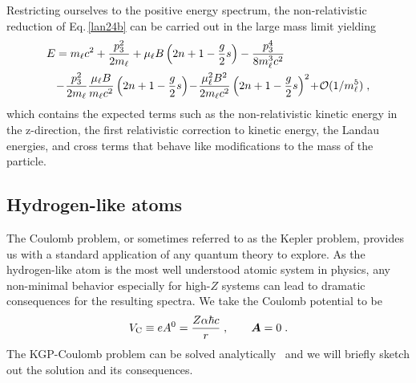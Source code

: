 Restricting ourselves to the positive energy spectrum, the non-relativistic reduction of Eq.\,\eqref{lan24b} can be carried out in the large mass limit yielding
\begin{alignat}{1}
\label{lan27} E&=m_{\ell}c^{2}+\frac{p_{3}^{2}}{2m_{\ell}}+\mu_{\ell}B\left(2n+1-\frac{g}{2}s\right)-\frac{p_{3}^{4}}{8m_{\ell}^{3}c^{2}}\\ \notag &\!-\!\frac{p_{3}^{2}}{2m_{\ell}}\frac{\mu_{\ell}B}{m_{\ell}c^{2}}\left(2n+1-\frac{g}{2}s\right)\!-\!\frac{\mu_{\ell}^{2}B^{2}}{2m_{\ell}c^{2}}\left(2n+1-\frac{g}{2}s\right)^{2}\!+\!\mathcal{O}(1/m_{\ell}^{5})\;,\end{alignat}
which contains the expected terms such as the non-relativistic kinetic energy in the z-direction, the first relativistic correction to kinetic energy, the Landau energies, and cross terms that behave like modifications to the mass of the particle.








\subsection{Hydrogen-like atoms}
\label{sec:coulomb}
The Coulomb problem, or sometimes referred to as the Kepler problem, provides us with a standard application of any quantum theory to explore. As the hydrogen-like atom is the most well understood atomic system in physics, any non-minimal behavior especially for high-$Z$ systems can lead to dramatic consequences for the resulting spectra. We take the Coulomb potential to be
\begin{equation}
	\label{eq:coulomb:01} V_\mathrm{C}\equiv e A^{0}=\frac{Z \alpha\hbar c}{r}\;,\qquad \boldsymbol{A}=0\;.
\end{equation}
The KGP-Coulomb problem can be solved analytically~\citep{Steinmetz:2018ryf} and we will briefly sketch out the solution and its consequences.

